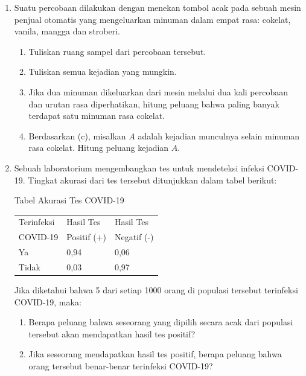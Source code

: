 \documentclass[11pt,letterpaper]{article}
\begin{document}
\vspace{0.25cm}
\noindent
\begin{enumerate}
  \item Suatu percobaan dilakukan dengan menekan tombol acak pada sebuah mesin penjual otomatis yang mengeluarkan minuman dalam empat rasa: cokelat, vanila, mangga dan stroberi.
        \begin{enumerate}[label=\alph*.]
          \item Tuliskan ruang sampel dari percobaan tersebut.
          \item Tuliskan semua kejadian yang mungkin.
          \item Jika dua minuman dikeluarkan dari mesin melalui dua kali percobaan dan urutan rasa diperhatikan, hitung peluang bahwa paling banyak terdapat satu minuman rasa cokelat.
          \item Berdasarkan (c), misalkan $A$ adalah kejadian munculnya selain minuman rasa cokelat. Hitung peluang kejadian $A$.
        \end{enumerate}
        \vspace{0.3cm}

  \item Sebuah laboratorium mengembangkan tes untuk mendeteksi infeksi COVID-19. Tingkat akurasi dari tes tersebut ditunjukkan dalam tabel berikut:
        \begin{center}
          Tabel Akurasi Tes COVID-19 \\
          \vspace{0.2cm}
          \begin{tabular}{|l|l|l|}
            \hline
            Terinfeksi & Hasil Tes   & Hasil Tes   \\
            COVID-19   & Positif (+) & Negatif (-) \\ \hline
            Ya         & 0,94        & 0,06        \\ \hline
            Tidak      & 0,03        & 0,97        \\ \hline
          \end{tabular}
        \end{center}
        Jika diketahui bahwa 5 dari setiap 1000 orang di populasi tersebut terinfeksi COVID-19, maka:
        \begin{enumerate}[label=\alph*.]
          \item Berapa peluang bahwa seseorang yang dipilih secara acak dari populasi tersebut akan mendapatkan hasil tes positif?
          \item Jika seseorang mendapatkan hasil tes positif, berapa peluang bahwa orang tersebut benar-benar terinfeksi COVID-19?
        \end{enumerate}
        \vspace{0.3cm}


\end{enumerate}
\end{document}
